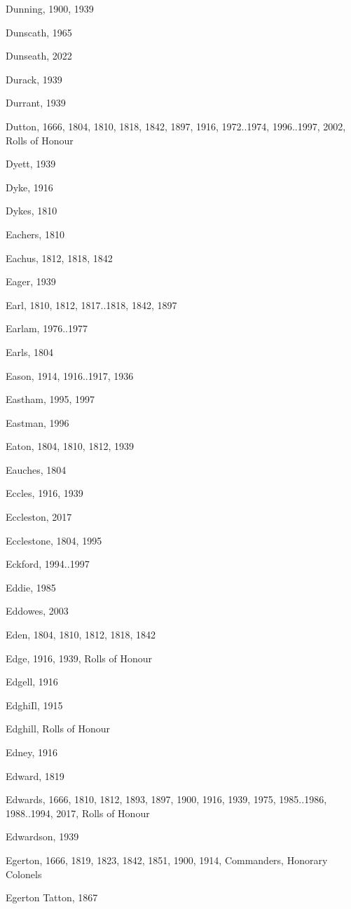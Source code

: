 {\begin{theindex}
\item Dunning, 1900, 1939
\item Dunscath, 1965
\item Dunseath, 2022
\item Durack, 1939
\item Durrant, 1939
\item Dutton, 1666, 1804, 1810, 1818, 1842, 1897, 1916, 1972..1974, 1996..1997, 2002, Rolls of Honour
\item Dyett, 1939
\item Dyke, 1916
\item Dykes, 1810
\item Eachers, 1810
\item Eachus, 1812, 1818, 1842
\item Eager, 1939
\item Earl, 1810, 1812, 1817..1818, 1842, 1897
\item Earlam, 1976..1977
\item Earls, 1804
\item Eason, 1914, 1916..1917, 1936
\item Eastham, 1995, 1997
\item Eastman, 1996
\item Eaton, 1804, 1810, 1812, 1939
\item Eauches, 1804
\item Eccles, 1916, 1939
\item Eccleston, 2017
\item Ecclestone, 1804, 1995
\item Eckford, 1994..1997
\item Eddie, 1985
\item Eddowes, 2003
\item Eden, 1804, 1810, 1812, 1818, 1842
\item Edge, 1916, 1939, Rolls of Honour
\item Edgell, 1916
\item EdghiIl, 1915
\item Edghill, Rolls of Honour
\item Edney, 1916
\item Edward, 1819
\item Edwards, 1666, 1810, 1812, 1893, 1897, 1900, 1916, 1939, 1975, 1985..1986, 1988..1994, 2017, Rolls of Honour
\item Edwardson, 1939
\item Egerton, 1666, 1819, 1823, 1842, 1851, 1900, 1914, Commanders, Honorary Colonels
\item Egerton Tatton, 1867

\end{theindex}}
